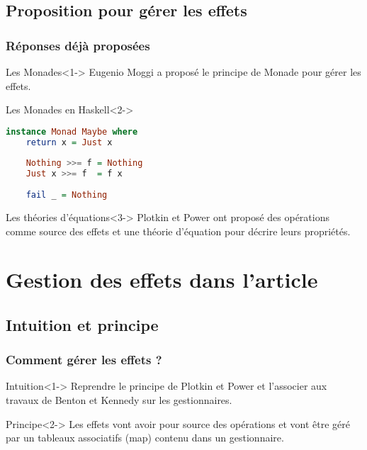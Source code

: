 \documentclass{beamer}
\begin{document}
\subsection{Proposition pour gérer les effets}
\begin{frame}[fragile]
	\frametitle{Réponses déjà proposées}

	\begin{block}{Les Monades}<1->
		Eugenio Moggi a proposé le principe de \alert{Monade} pour gérer les effets.
	\end{block}

	\begin{exampleblock}{Les Monades en Haskell}<2->
		\begin{lstlisting}[language=Haskell]
instance Monad Maybe where
	return x = Just x
			
	Nothing >>= f = Nothing
	Just x >>= f  = f x
					
	fail _ = Nothing
		\end{lstlisting}
	\end{exampleblock}

	\begin{block}{Les théories d'équations}<3->
		Plotkin et Power ont proposé des opérations comme source des effets et une
		\alert{théorie d'équation} pour décrire leurs propriétés.
	\end{block}
\end{frame}

\section{Gestion des effets dans l'article}

\subsection{Intuition et principe}
\begin{frame}
	\frametitle{Comment gérer les effets ?}
	\begin{block}{Intuition}<1->
		Reprendre le principe de Plotkin et Power et l'associer aux travaux de Benton et Kennedy sur
		les gestionnaires.
	\end{block}

	\begin{block}{Principe}<2->
		Les effets vont avoir pour source des \alert{opérations} et vont être géré par 
		un \alert{tableaux associatifs (map)} contenu dans un gestionnaire. 
	\end{block}
\end{frame}
\end{document}
